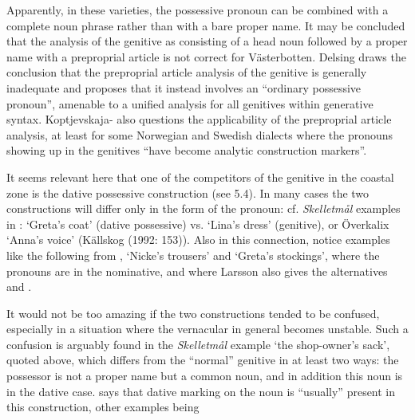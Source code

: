 Apparently, in these varieties, the possessive pronoun can be combined with a complete noun phrase rather than with a bare proper name. It may be concluded that the analysis of the genitive as consisting of a head noun followed by a proper name with a preproprial article is not correct for Västerbotten.  Delsing draws the conclusion that the preproprial article analysis of the genitive is generally inadequate and proposes that it instead involves an “ordinary possessive pronoun”, amenable to a unified analysis for all genitives within generative syntax. Koptjevskaja-\citet{Tamm2003} also questions the applicability of the preproprial article analysis, at least for some Norwegian and Swedish dialects where the pronouns showing up in the genitives “have become analytic construction markers”. 


It seems relevant here that one of the competitors of the genitive in the coastal zone is the dative possessive construction (see 5.4). In many cases the two constructions will differ only in the form of the pronoun: cf. \textit{Skelletmål} examples in \citet{Marklund1976}:  ‘Greta’s coat’ (dative possessive) vs.   ‘Lina’s dress’ (genitive), or Överkalix  ‘Anna’s voice’ (Källskog (1992: 153)). Also in this connection, notice examples like the following from \citet[125]{Larsson1929}, ‘Nicke’s trousers’ and  ‘Greta’s stockings’, where the pronouns are in the nominative, and where Larsson also gives the alternatives  and .


It would not be too amazing if the two constructions tended to be confused, especially in a situation where the vernacular in general becomes unstable. Such a confusion is arguably found in the \textit{Skelletmål} example ‘the shop-owner’s sack’, quoted above, which differs from the “normal” genitive in at least two ways: the possessor is not a proper name but a common noun, and in addition this noun is in the dative case. \citet[23]{Marklund1976} says that dative marking on the noun is “usually” present in this construction, other examples being 

